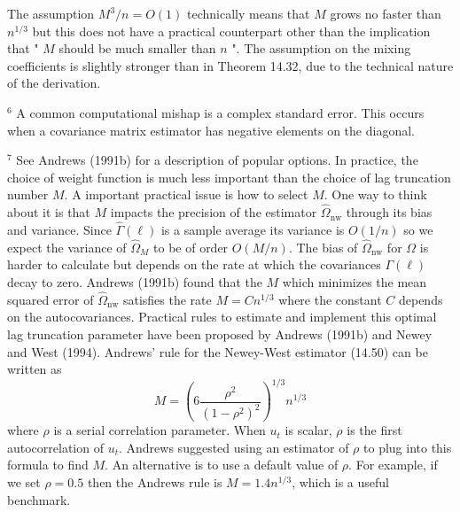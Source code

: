 \documentclass[10pt]{article}
\begin{document}
The assumption $M^{3} / n=O(1)$ technically means that $M$ grows no faster than $n^{1 / 3}$ but this does not have a practical counterpart other than the implication that " $M$ should be much smaller than $n$ ". The assumption on the mixing coefficients is slightly stronger than in Theorem 14.32, due to the technical nature of the derivation.

${ }^{6}$ A common computational mishap is a complex standard error. This occurs when a covariance matrix estimator has negative elements on the diagonal.

${ }^{7}$ See Andrews (1991b) for a description of popular options. In practice, the choice of weight function is much less important than the choice of lag truncation number $M$. A important practical issue is how to select $M$. One way to think about it is that $M$ impacts the precision of the estimator $\widehat{\Omega}_{\mathrm{nw}}$ through its bias and variance. Since $\widehat{\Gamma}(\ell)$ is a sample average its variance is $O(1 / n)$ so we expect the variance of $\widehat{\Omega}_{M}$ to be of order $O(M / n)$. The bias of $\widehat{\Omega}_{\mathrm{nw}}$ for $\Omega$ is harder to calculate but depends on the rate at which the covariances $\Gamma(\ell)$ decay to zero. Andrews (1991b) found that the $M$ which minimizes the mean squared error of $\widehat{\Omega}_{\mathrm{nw}}$ satisfies the rate $M=C n^{1 / 3}$ where the constant $C$ depends on the autocovariances. Practical rules to estimate and implement this optimal lag truncation parameter have been proposed by Andrews (1991b) and Newey and West (1994). Andrews' rule for the Newey-West estimator (14.50) can be written as
$$
M=\left(6 \frac{\rho^{2}}{\left(1-\rho^{2}\right)^{2}}\right)^{1 / 3} n^{1 / 3}
$$
where $\rho$ is a serial correlation parameter. When $u_{t}$ is scalar, $\rho$ is the first autocorrelation of $u_{t}$. Andrews suggested using an estimator of $\rho$ to plug into this formula to find $M$. An alternative is to use a default value of $\rho$. For example, if we set $\rho=0.5$ then the Andrews rule is $M=1.4 n^{1 / 3}$, which is a useful benchmark.
\end{document}
